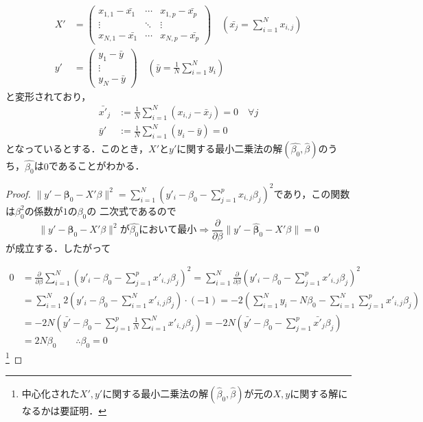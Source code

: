 \documentclass{jsarticle}
\theoremstyle{definition}
\begin{document}
\begin{align*}
X'&=\begin{pmatrix}
x_{1,1}-\bar{x_1}&\cdots & x_{1,p}-\bar{x_p}\\
\vdots & \ddots & \vdots\\
x_{N,1}-\bar{x_1}& \cdots & x_{N,p}-\bar{x_p}
\end{pmatrix}\quad \left(\bar{x_j}=\sum_{i=1}^N x_{i,j}\right)\\
y'&=\left(
\begin{array}{c}
y_1-\bar{y}\\
\vdots\\
y_N-\bar{y}
\end{array}\right)\quad \left(\bar{y}=\frac{1}{N}\sum_{i=1}^N y_i\right)
\end{align*}
と変形されており，
\begin{align*}
\bar{x'}_j&:=\frac{1}{N}\sum_{i=1}^N (x_{i,j}-\bar{x}_j)=0\quad \forall j\\
\bar{y}'&:=\frac{1}{N}\sum_{i=1}^N (y_i-\bar{y})=0
\end{align*}
となっているとする．このとき，$X'$と$y'$に関する最小二乗法の解$(\hat{\beta_0},\hat{\beta})$のうち，$\hat{\beta_0}$は$0$であることがわかる．

\begin{proof}
$\|y' -{\bm \beta}_0-X'\beta\|^2=\sum_{i=1}^N \left(y'_i-\beta_0-\sum_{j=1}^px_{i,j}\beta_j\right)^2$であり，この関数は$\beta_0^2$の係数が$1$の$\beta_0$の	二次式であるので
$$\|y' -{\bm \beta}_0-X'\beta\|^2が\hat{\beta_0}において最小\Rightarrow \frac{\partial}{\partial \beta}\|y' -{\bm \hat{\beta}_0}-X'\beta\|=0$$
が成立する．したがって


\begin{align*}
0&= \frac{\partial}{\partial \beta}\sum_{i=1}^N \left(y'_i-\beta_0-\sum_{j=1}^px'_{i,j}\beta_j\right)^2=\sum_{i=1}^N\frac{\partial}{\partial \beta}\left(y'_i-\beta_0-\sum_{j=1}^px'_{i,j}\beta_j\right)^2\\
&=\sum_{i=1}^N 2\left(y'_i-\beta_0-\sum_{i=1}^Nx'_{i,j}\beta_j\right)\cdot (-1)=-2\left(\sum_{i=1}^Ny_i-N\beta_0-\sum_{i=1}^N\sum_{j=1}^px'_{i,j}\beta_j\right)\\
&=-2N\left(\bar{y'}-\beta_0-\sum_{j=1}^p\frac{1}{N}\sum_{i=1}^N x'_{i,j}\beta_j\right)=-2N\left(\bar{y'}-\beta_0-\sum_{j=1}^p\bar{x'}_j\beta_j\right)\\
&=2N \beta_0\qquad \therefore \beta_0=0
\end{align*}\footnote{中心化された$X',y'$に関する最小二乗法の解$(\hat{\beta}_0,\hat{\beta})$が元の$X,y$に関する解になるかは要証明．}
\end{proof}
\end{document}
